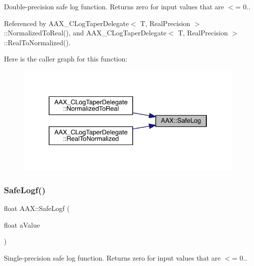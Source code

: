 Double-\/precision safe log function. Returns zero for input values that are $<$= 0.. 



Referenced by A\+A\+X\+\_\+\+C\+Log\+Taper\+Delegate$<$ T, Real\+Precision $>$\+::\+Normalized\+To\+Real(), and A\+A\+X\+\_\+\+C\+Log\+Taper\+Delegate$<$ T, Real\+Precision $>$\+::\+Real\+To\+Normalized().

Here is the caller graph for this function\+:
\nopagebreak
\begin{figure}[H]
\begin{center}
\leavevmode
\includegraphics[width=325pt]{a00852_ae8de30637f08cd29bb0e27526ce9e21b_icgraph}
\end{center}
\end{figure}
\mbox{\label{a00852_ad762727aac31ad8b7bba8b67a4bc2edc}} 
\subsubsection{\texorpdfstring{SafeLogf()}{SafeLogf()}}
{\footnotesize\ttfamily float A\+A\+X\+::\+Safe\+Logf (\begin{DoxyParamCaption}\item[{float}]{a\+Value }\end{DoxyParamCaption})\hspace{0.3cm}{\ttfamily [inline]}}



Single-\/precision safe log function. Returns zero for input values that are $<$= 0.. 

\mbox{\label{a00852_ae4d1a0a925aa954899fec653dc041b75}} 
